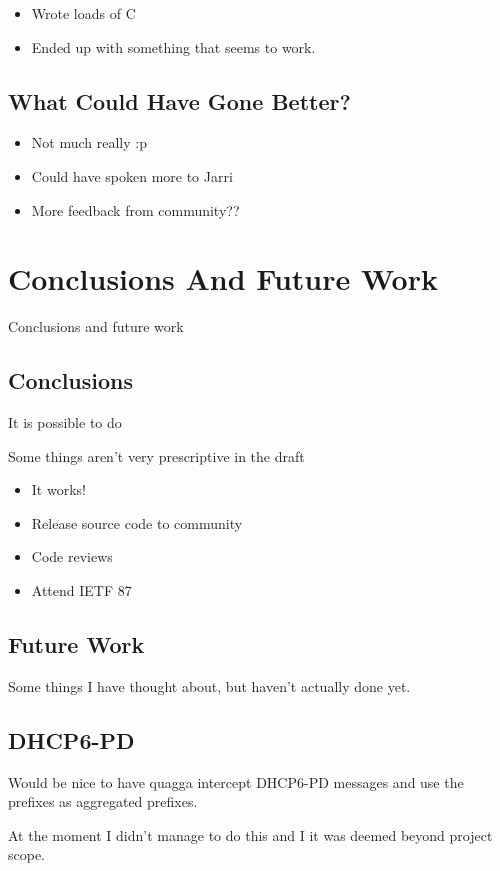 \documentclass[12pt]{report}
\begin{document}
\begin{itemize}
\item Wrote loads of C
\item Ended up with something that seems to work.
\end{itemize}

\section{What Could Have Gone Better?}

\begin{itemize}
\item Not much really :p
\item Could have spoken more to Jarri
\item More feedback from community??
\end{itemize}

\chapter{Conclusions And Future Work}
Conclusions and future work

\section{Conclusions}

It is possible to do

Some things aren't very prescriptive in the draft

\begin{itemize}
\item It works! 
\item Release source code to community
\item Code reviews
\item Attend IETF 87
\end{itemize}

\section{Future Work}
Some things I have thought about, but haven't actually done yet.

\section{DHCP6-PD}
Would be nice to have quagga intercept DHCP6-PD messages and use the prefixes as aggregated prefixes. 

At the moment I didn't manage to do this and I it was deemed beyond project scope.
\end{document}
